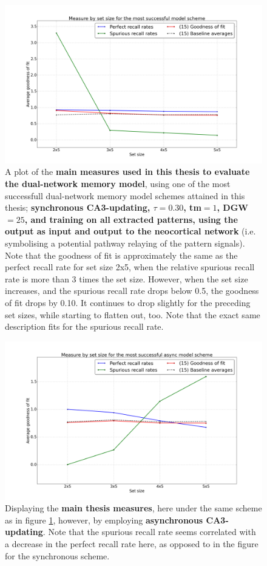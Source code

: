 \begin{figure}
    \centering
    \includegraphics[width=14cm]{fig/neo-consolidation/combined-measures-sync}
    \caption{A plot of the \textbf{main measures used in this thesis to evaluate the dual-network memory model}, using one of the most successfull dual-network memory model schemes attained in this thesis; \textbf{synchronous CA3-updating, $\tau=0.30$, tm$=1$, DGW$=25$, and training on all extracted patterns, using the output as input and output to the neocortical network} (i.e. symbolising a potential pathway relaying of the pattern signals). Note that the goodness of fit is approximately the same as the perfect recall rate for set size 2x5, when the relative spurious recall rate is more than 3 times the set size. However, when the set size increases, and the spurious recall rate drops below 0.5, the goodness of fit drops by 0.10. It continues to drop slightly for the preceding set sizes, while starting to flatten out, too. Note that the exact same description fits for the spurious recall rate.}
    \label{fig:combined-measures-sync}
\end{figure}

\begin{figure}
    \centering
    \includegraphics[width=14cm]{fig/neo-consolidation/combined-measures-async}
    \caption{Displaying the \textbf{main thesis measures}, here under the same scheme as in figure \ref{fig:combined-measures-sync}, however, by employing \textbf{asynchronous CA3-updating}. Note that the spurious recall rate seems correlated with a decrease in the perfect recall rate here, as opposed to in the figure for the synchronous scheme.}
    \label{fig:combined-measures-async}
\end{figure}

